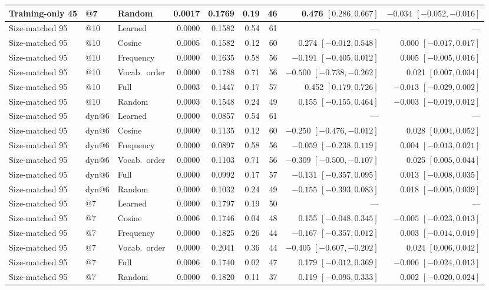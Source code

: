 \begin{center}
\begin{tabular}{lllrrrrrr}
Training-only 45 & @7 & Random & 0.0017 & 0.1769 & 0.19 & 46 & 0.476 $[0.286,0.667]$ & $-0.034$ $[-0.052,-0.016]$\\
\midrule
Size-matched 95 & @10 & Learned & 0.0000 & 0.1582 & 0.54 & 61 & --- & ---\\
Size-matched 95 & @10 & Cosine & 0.0005 & 0.1582 & 0.12 & 60 & 0.274 $[-0.012,0.548]$ & 0.000 $[-0.017,0.017]$\\
Size-matched 95 & @10 & Frequency & 0.0000 & 0.1635 & 0.58 & 56 & $-0.191$ $[-0.405,0.012]$ & 0.005 $[-0.005,0.016]$\\
Size-matched 95 & @10 & Vocab.\ order & 0.0000 & 0.1788 & 0.71 & 56 & $-0.500$ $[-0.738,-0.262]$ & 0.021 $[0.007,0.034]$\\
Size-matched 95 & @10 & Full & 0.0003 & 0.1447 & 0.17 & 57 & 0.452 $[0.179,0.726]$ & $-0.013$ $[-0.029,0.002]$\\
Size-matched 95 & @10 & Random & 0.0003 & 0.1548 & 0.24 & 49 & 0.155 $[-0.155,0.464]$ & $-0.003$ $[-0.019,0.012]$\\
Size-matched 95 & dyn@6 & Learned & 0.0000 & 0.0857 & 0.54 & 61 & --- & ---\\
Size-matched 95 & dyn@6 & Cosine & 0.0000 & 0.1135 & 0.12 & 60 & $-0.250$ $[-0.476,-0.012]$ & 0.028 $[0.004,0.052]$\\
Size-matched 95 & dyn@6 & Frequency & 0.0000 & 0.0897 & 0.58 & 56 & $-0.059$ $[-0.238,0.119]$ & 0.004 $[-0.013,0.021]$\\
Size-matched 95 & dyn@6 & Vocab.\ order & 0.0000 & 0.1103 & 0.71 & 56 & $-0.309$ $[-0.500,-0.107]$ & 0.025 $[0.005,0.044]$\\
Size-matched 95 & dyn@6 & Full & 0.0000 & 0.0992 & 0.17 & 57 & $-0.131$ $[-0.357,0.095]$ & 0.013 $[-0.008,0.035]$\\
Size-matched 95 & dyn@6 & Random & 0.0000 & 0.1032 & 0.24 & 49 & $-0.155$ $[-0.393,0.083]$ & 0.018 $[-0.005,0.039]$\\
Size-matched 95 & @7 & Learned & 0.0000 & 0.1797 & 0.19 & 50 & --- & ---\\
Size-matched 95 & @7 & Cosine & 0.0006 & 0.1746 & 0.04 & 48 & 0.155 $[-0.048,0.345]$ & $-0.005$ $[-0.023,0.013]$\\
Size-matched 95 & @7 & Frequency & 0.0000 & 0.1825 & 0.26 & 44 & $-0.167$ $[-0.357,0.012]$ & 0.003 $[-0.014,0.019]$\\
Size-matched 95 & @7 & Vocab.\ order & 0.0000 & 0.2041 & 0.36 & 44 & $-0.405$ $[-0.607,-0.202]$ & 0.024 $[0.006,0.042]$\\
Size-matched 95 & @7 & Full & 0.0006 & 0.1740 & 0.02 & 47 & 0.179 $[-0.012,0.369]$ & $-0.006$ $[-0.024,0.013]$\\
Size-matched 95 & @7 & Random & 0.0000 & 0.1820 & 0.11 & 37 & 0.119 $[-0.095,0.333]$ & 0.002 $[-0.020,0.024]$\\
\bottomrule
\end{tabular}\end{center}
